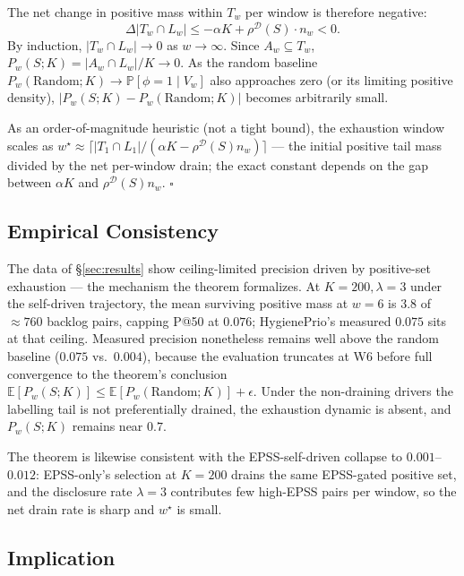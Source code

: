 The net change in positive mass within $T_w$ per window is therefore
negative:
\begin{equation}
\Delta |T_w \cap L_w| \leq -\alpha K + \rho^{\mathcal{D}}(S) \cdot n_w < 0.
\end{equation}
By induction, $|T_w \cap L_w| \to 0$ as $w \to \infty$. Since $A_w
\subseteq T_w$, $P_w(S; K) = |A_w \cap L_w| / K \to 0$. As the random
baseline $P_w(\mathrm{Random}; K) \to \mathbb{P}[\phi = 1 \mid V_w]$
also approaches zero (or its limiting positive density),
$|P_w(S; K) - P_w(\mathrm{Random}; K)|$ becomes arbitrarily small.

As an order-of-magnitude heuristic (not a tight bound), the
exhaustion window scales as
$w^\star \approx \lceil |T_1 \cap L_1| / (\alpha K -
\rho^{\mathcal{D}}(S) n_w) \rceil$ --- the initial positive tail mass
divided by the net per-window drain; the exact constant depends on
the gap between $\alpha K$ and $\rho^{\mathcal{D}}(S) n_w$.
\hfill$\square$

\subsection{Empirical Consistency}

The data of \S\ref{sec:results} show ceiling-limited precision driven
by positive-set exhaustion --- the mechanism the theorem formalizes.
At $K = 200, \lambda = 3$ under the self-driven trajectory, the mean
surviving positive mass at $w = 6$ is $3.8$ of $\approx 760$ backlog
pairs, capping P@50 at $0.076$; HygienePrio's measured $0.075$ sits
at that ceiling. Measured precision nonetheless remains well above
the random baseline ($0.075$ vs.\ $0.004$), because the evaluation
truncates at W6 before full convergence to the theorem's conclusion
$\mathbb{E}[P_w(S;K)] \leq \mathbb{E}[P_w(\mathrm{Random};K)] +
\epsilon$. Under the non-draining drivers the labelling tail is not
preferentially drained, the exhaustion dynamic is absent, and
$P_w(S; K)$ remains near $0.7$.

The theorem is likewise consistent with the EPSS-self-driven collapse
to $0.001$--$0.012$: EPSS-only's selection at $K = 200$ drains the
same EPSS-gated positive set, and the disclosure rate $\lambda = 3$
contributes few high-EPSS pairs per window, so the net drain rate is
sharp and $w^\star$ is small.

\subsection{Implication}

